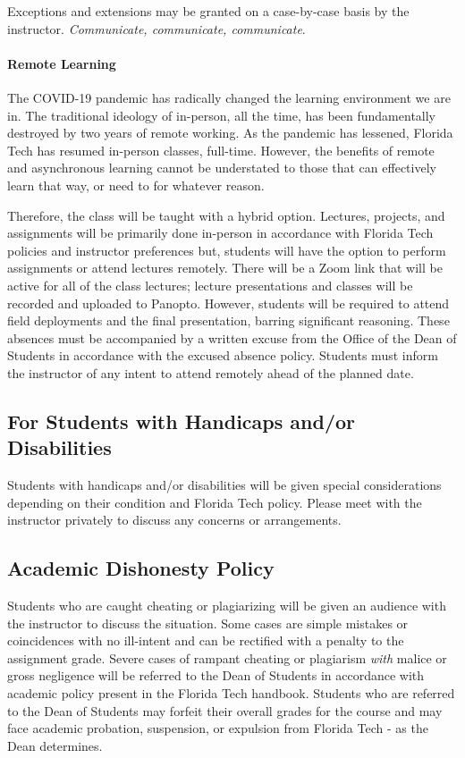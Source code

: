 \documentclass[
	letterpaper, %
	fontsize=10pt, %
	twoside=true, %
	numbers=noenddot, %
]{kaobook}
\begin{document}
Exceptions and extensions may be granted on a case-by-case basis by the instructor.
\emph{Communicate, communicate, communicate}.

\paragraph*{Remote Learning} The COVID-19 pandemic has radically changed the learning environment we are in.
The traditional ideology of in-person, all the time, has been fundamentally destroyed by two years of remote working.
As the pandemic has lessened, Florida Tech has resumed in-person classes, full-time.
However, the benefits of remote and asynchronous learning cannot be understated to those that can effectively learn that way, or need to for whatever reason.

Therefore, the class will be taught with a hybrid option.
Lectures, projects, and assignments will be primarily done in-person in accordance with Florida Tech policies and instructor preferences but, students will have the option to perform assignments or attend lectures remotely.
There will be a Zoom link that will be active for all of the class lectures; lecture presentations and classes will be recorded and uploaded to Panopto.
However, students will be required to attend field deployments and the final presentation, barring significant reasoning.
These absences must be accompanied by a written excuse from the Office of the Dean of Students in accordance with the excused absence policy.
Students must inform the instructor of any intent to attend remotely ahead of the planned date.

\subsection*{For Students with Handicaps and/or Disabilities} \label{ssec:accommodations}
Students with handicaps and/or disabilities will be given special considerations depending on their condition and Florida Tech policy. Please meet with the instructor privately to discuss any concerns or arrangements. 

\subsection*{Academic Dishonesty Policy} \label{ssec:academic_dishonesty}
Students who are caught cheating or plagiarizing will be given an audience with the instructor to discuss the situation. 
Some cases are simple mistakes or coincidences with no ill-intent and can be rectified with a penalty to the assignment grade.
Severe cases of rampant cheating or plagiarism \emph{with} malice or gross negligence will be referred to the Dean of Students in accordance with academic policy present in the Florida Tech handbook.
Students who are referred to the Dean of Students may forfeit their overall grades for the course and may face academic probation, suspension, or expulsion from Florida Tech - as the Dean determines.
\end{document}
